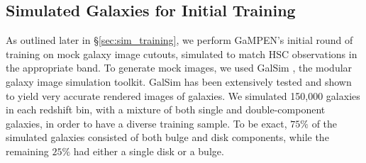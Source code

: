 \documentclass[linenumbers,twocolumn,twocolappendix]{aastex631}
\newcommand\gampen{GaMPEN}
\begin{document}
\begin{CJK*}{UTF8}{gbsn}
\subsection{Simulated Galaxies for Initial Training} \label{sec:sim_data}

As outlined later in \S \ref{sec:sim_training}, we perform \gampen{}'s initial round of training on mock galaxy image cutouts, simulated to match HSC observations in the appropriate band. To generate mock images, we used GalSim \citep{Rowe2015GalSim:Toolkit}, the modular galaxy image simulation toolkit. GalSim has been extensively tested and shown to yield very accurate rendered images of galaxies. We simulated 150,000 galaxies in each redshift bin, with a mixture of both single and double-component galaxies, in order to have a diverse training sample. To be exact, $75\%$ of the simulated galaxies consisted of both bulge and disk components, while the remaining $25\%$ had either a single disk or a bulge.


\end{CJK*}
\end{document}
